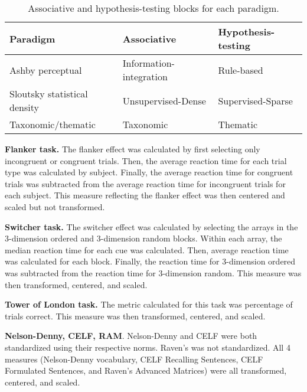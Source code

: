 \documentclass[../dissertation.tex]{subfiles}
\begin{document}
\begin{table}[H]
\caption{Associative and hypothesis-testing blocks for each paradigm.}
\vspace{-10pt}
\begin{center}
\begin{tabularx}{\textwidth}{>{\centering\arraybackslash}p{5cm}YY}
 \toprule
Paradigm                     & Associative             & Hypothesis-testing \\
\midrule
Ashby perceptual             & Information-integration & Rule-based         \\
Sloutsky statistical density & Unsupervised-Dense      & Supervised-Sparse  \\
Taxonomic/thematic           & Taxonomic               & Thematic  \\
 \bottomrule 
\end{tabularx}
\label{exp2systems}
\end{center}
\end{table}
	
	\textbf{Flanker task.} The flanker effect was calculated by first selecting only incongruent or congruent trials. Then, the average reaction time for each trial type was calculated by subject. Finally, the average reaction time for congruent trials was subtracted from the average reaction time for incongruent trials for each subject. This measure reflecting the flanker effect was then centered and scaled but not transformed. \par
	\textbf{Switcher task.} The switcher effect was calculated by selecting the arrays in the 3-dimension ordered and 3-dimension random blocks. Within each array, the median reaction time for each cue was calculated. Then, average reaction time was calculated for each block. Finally, the reaction time for 3-dimension ordered was subtracted from the reaction time for 3-dimension random. This measure was then transformed, centered, and scaled. \par 
	\textbf{Tower of London task.} The metric calculated for this task was percentage of trials correct. This measure was then transformed, centered, and scaled. \par 
	\textbf{Nelson-Denny, CELF, RAM}. Nelson-Denny and CELF were both standardized using their respective norms. Raven's was not standardized. All 4 measures (Nelson-Denny vocabulary, CELF Recalling Sentences, CELF Formulated Sentences, and Raven's Advanced Matrices) were all transformed, centered, and scaled.
	
\end{document}
